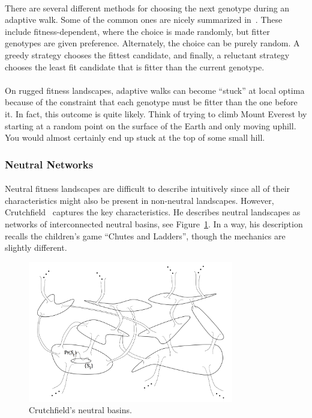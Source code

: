 \documentclass[12pt,letterpaper,titlepage]{article}
\begin{document}
\paragraph{}
There are several different methods for choosing the next genotype during an
adaptive walk. Some of the common ones are nicely summarized
in~\cite{Nowak2015}. These include fitness-dependent, where the choice is made
randomly, but fitter genotypes are given preference. Alternately, the choice
can be purely random. A greedy strategy chooses the fittest candidate, and
finally, a reluctant strategy chooses the least fit candidate that is fitter
than the current genotype.

\paragraph{}
On rugged fitness landscapes, adaptive walks can become ``stuck'' at local
optima because of the constraint that each genotype must be fitter than the one
before it. In fact, this outcome is quite likely. Think of trying to climb
Mount Everest by starting at a random point on the surface of the Earth and
only moving uphill. You would almost certainly end up stuck at the top of some
small hill.

\subsubsection{Neutral Networks}

\paragraph{}
Neutral fitness landscapes are difficult to describe intuitively since all of
their characteristics might also be present in non-neutral landscapes. However,
Crutchfield~\cite{Crutchfield1999} captures the key characteristics. He
describes neutral landscapes as networks of interconnected neutral basins,
see Figure~\ref{fig:crutchfield-basins}. In a way, his description recalls the children's
game ``Chutes and Ladders'', though the mechanics are slightly different.

\begin{figure}
    \centering
    \includegraphics[width=0.8\textwidth]{crutchfield-basins}
    \caption{Crutchfield's neutral basins.}
\label{fig:crutchfield-basins}
\end{figure}
\end{document}
